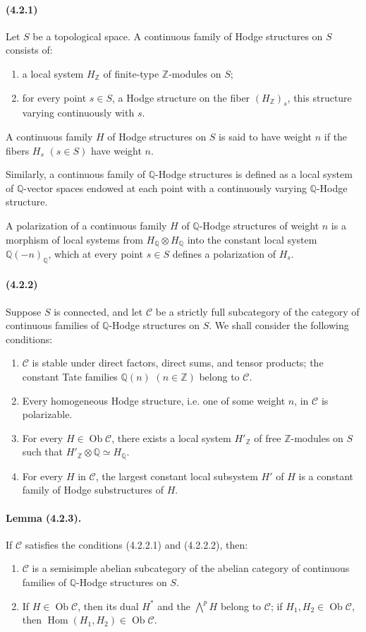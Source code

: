 \documentclass[10pt]{article}
\newcommand{\Q}{\mathbb Q}
\newcommand{\Z}{\mathbb Z}
\newcommand{\Hom}{\operatorname{Hom}}
\newcommand{\Ob}{\operatorname{Ob}}
\begin{document}
\paragraph{(4.2.1)} Let $S$ be a topological space. A continuous family of Hodge structures on $S$ consists of:
\begin{enumerate}[label=\alph*)]
\item a local system $H_\Z$ of finite-type $\Z$-modules on $S$;
\item for every point $s\in S$, a Hodge structure on the fiber $(H_\Z)_s$, this structure varying continuously with $s$.
\end{enumerate}
A continuous family $H$ of Hodge structures on $S$ is said to have weight $n$ if the fibers $H_s$ $(s\in S)$ have weight $n$.

Similarly, a continuous family of $\Q$-Hodge structures is defined as a local system of $\Q$-vector spaces endowed at each point with a continuously varying $\Q$-Hodge structure.

A polarization of a continuous family $H$ of $\Q$-Hodge structures of weight $n$ is a morphism of local systems from $H_\Q\otimes H_\Q$ into the constant local system $\Q(-n)_\Q$, which at every point $s\in S$ defines a polarization of $H_s$.

\paragraph{(4.2.2)} Suppose $S$ is connected, and let $\mathcal C$ be a strictly full subcategory of the category of continuous families of $\Q$-Hodge structures on $S$. We shall consider the following conditions:
\begin{enumerate}[label=(4.2.2.\arabic*)]
\item $\mathcal C$ is stable under direct factors, direct sums, and tensor products; the constant Tate families $\Q(n)$ $(n\in\Z)$ belong to $\mathcal C$.
\item Every homogeneous Hodge structure, i.e. one of some weight $n$, in $\mathcal C$ is polarizable.
\item For every $H\in\Ob\mathcal C$, there exists a local system $H'_\Z$ of free $\Z$-modules on $S$ such that $H'_\Z\otimes\Q\simeq H_\Q$.
\item For every $H$ in $\mathcal C$, the largest constant local subsystem $H'$ of $H$ is a constant family of Hodge substructures of $H$.
\end{enumerate}

\paragraph{Lemma (4.2.3).} If $\mathcal C$ satisfies the conditions (4.2.2.1) and (4.2.2.2), then:
\begin{enumerate}[label=(\roman*)]
\item $\mathcal C$ is a semisimple abelian subcategory of the abelian category of continuous families of $\Q$-Hodge structures on $S$.
\item If $H\in\Ob\mathcal C$, then its dual $H^*$ and the $\bigwedge^pH$ belong to $\mathcal C$; if $H_1,H_2\in\Ob\mathcal C$, then $\Hom(H_1,H_2)\in\Ob\mathcal C$.
\end{enumerate}
\end{document}
